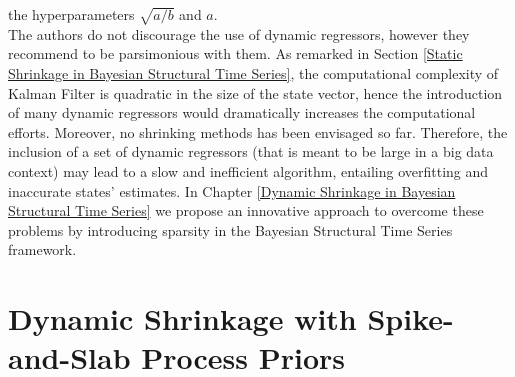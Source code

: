 \documentclass[
  12pt,
]{book}
\theoremstyle{break}
\theoremstyle{nonumberplain}
\begin{document}
the hyperparameters \(\sqrt{a/b}\) and \(a\).\\
The authors do not discourage the use of dynamic regressors, however
they recommend to be parsimonious with them. As remarked in Section
\ref{Static Shrinkage in Bayesian Structural Time Series}, the
computational complexity of Kalman Filter is quadratic in the size of
the state vector, hence the introduction of many dynamic regressors
would dramatically increases the computational efforts. Moreover, no
shrinking methods has been envisaged so far. Therefore, the inclusion of
a set of dynamic regressors (that is meant to be large in a big data
context) may lead to a slow and inefficient algorithm, entailing
overfitting and inaccurate states' estimates. In Chapter
\ref{Dynamic Shrinkage in Bayesian Structural Time Series} we propose an
innovative approach to overcome these problems by introducing sparsity
in the Bayesian Structural Time Series framework.

\chapter[Dynamic Shrinkage]{Dynamic Shrinkage with Spike-and-Slab Process Priors}\label{Dynamic Shrinkage}
\end{document}
